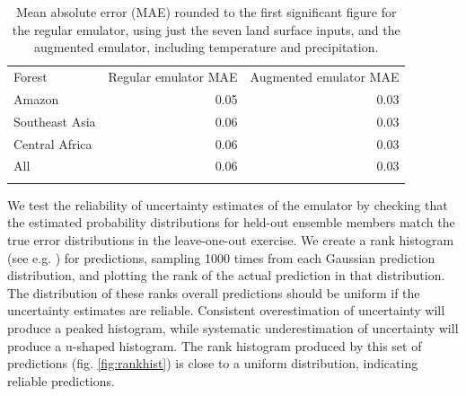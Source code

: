 \documentclass[gmd, manuscript]{copernicus}
\begin{document}

\begin{table}[t]
\caption{Mean absolute error (MAE) rounded to the first significant figure for the regular emulator, using just the seven land surface inputs, and the augmented emulator, including temperature and precipitation.}
\begin{tabular}{lrr}
\tophline

Forest                & Regular emulator MAE & Augmented emulator MAE \\
\middlehline
Amazon              & 0.05                              & 0.03                                     \\
Southeast Asia  & 0.06                               & 0.03                                    \\
Central Africa    & 0.06                               & 0.03                                      \\
All                      & 0.06                              & 0.03                                       \\

\bottomhline
\end{tabular}
\belowtable{} %
\label{tab:mae}
\end{table}

We test the reliability of uncertainty estimates of the emulator by checking that the estimated probability distributions for held-out ensemble members match the true error distributions in the leave-one-out exercise. We create a rank histogram (see e.g. \cite{hamill2001interpretation}) for predictions, sampling 1000 times from each Gaussian prediction distribution, and plotting the rank of the actual prediction in that distribution. The distribution of these ranks overall predictions should be uniform if the uncertainty estimates are reliable. Consistent overestimation of uncertainty will produce a peaked histogram, while systematic underestimation of uncertainty will produce a u-shaped histogram. The rank histogram produced by this set of predictions (fig. \ref{fig:rankhist}) is close to a uniform distribution, indicating reliable predictions.
\end{document}
